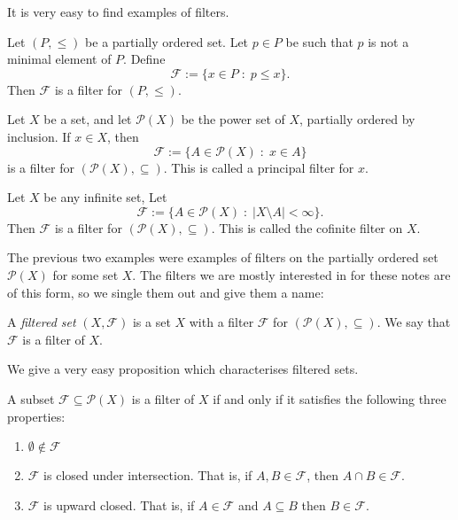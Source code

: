 \documentclass{owmaths}
\begin{document}
It is very easy to find examples of filters.
\begin{example}
    Let $(P,\leq)$ be a partially ordered set. Let $p \in P$ be such
    that $p$ is not a minimal element of $P$. Define
    \begin{equation*}
        \mathcal{F} := \{x \in P\;:\; p\leq x\}.
    \end{equation*}    
    Then $\mathcal{F}$ is a filter for $(P,\leq)$.
\end{example}
\begin{example}
    Let $X$ be a set, and let $\mathcal{P}(X)$ be the power set
    of $X$, partially ordered by inclusion. If $x \in X$, then
    \begin{equation*}
        \mathcal{F} := \{ A \in \mathcal{P}(X)\;:\; x \in A\}
    \end{equation*}
    is a filter for $(\mathcal{P}(X),\subseteq)$. This is called a principal
    filter for $x$.\\
    
\end{example}
\begin{example}
    Let $X$ be any infinite set, Let 
    \begin{equation*}
        \mathcal{F} := \{ A \in \mathcal{P}(X)\;:\;|X\setminus A| < \infty\}.
    \end{equation*}
    Then $\mathcal{F}$ is a filter for $(\mathcal{P}(X),\subseteq)$. This
    is called the cofinite filter on $X$.
\end{example}

The previous two examples were examples of filters on the partially ordered
set $\mathcal{P}(X)$ for some set $X$. The filters we are mostly
interested in for these notes are of this form, so we single
them out and give them a name:
\begin{definition}
    A \emph{filtered set} $(X,\mathcal{F})$ is a set $X$
    with a filter $\mathcal{F}$ for $(\mathcal{P}(X),\subseteq)$. 
    We say that $\mathcal{F}$ is a filter of $X$.
\end{definition}

We give a very easy proposition which characterises filtered sets.
\begin{proposition}
    A subset $\mathcal{F} \subseteq \mathcal{P}(X)$ is a filter of $X$
    if and only if it satisfies the following three properties:
    \begin{enumerate}
    \item{} $\emptyset \notin \mathcal{F}$
    \item{} $\mathcal{F}$ is closed under intersection. That is, if $A,B\in \mathcal{F}$,
    then $A \cap B \in \mathcal{F}$.
    \item{} $\mathcal{F}$ is upward closed. That is, if $A \in \mathcal{F}$
    and $A \subseteq B$ then $B \in \mathcal{F}$.
    \end{enumerate}
\end{proposition}
\end{document}
